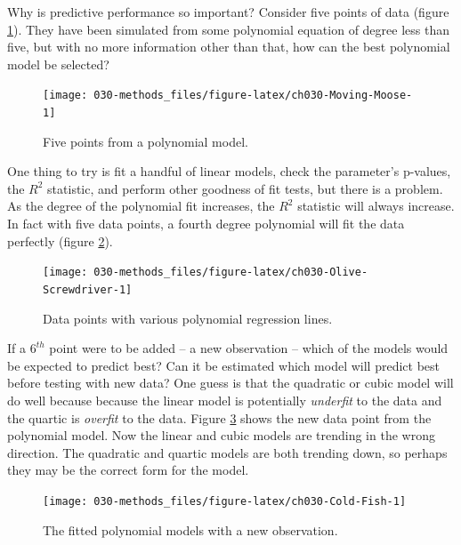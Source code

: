 \documentclass[11pt, oneside, openany]{scrbook}
\begin{document}
Why is predictive performance so important? Consider five points of data (figure \ref{fig:ch030-Moving-Moose}). They have been simulated from some polynomial equation of degree less than five, but with no more information other than that, how can the best polynomial model be selected?

\begin{figure}

{\centering \texttt{[image: 030-methods\_files/figure-latex/ch030-Moving-Moose-1]} 

}

\caption{Five points from a polynomial model.}\label{fig:ch030-Moving-Moose}
\end{figure}

One thing to try is fit a handful of linear models, check the parameter's p-values, the \(R^2\) statistic, and perform other goodness of fit tests, but there is a problem. As the degree of the polynomial fit increases, the \(R^2\) statistic will always increase. In fact with five data points, a fourth degree polynomial will fit the data perfectly (figure \ref{fig:ch030-Olive-Screwdriver}).

\begin{figure}

{\centering \texttt{[image: 030-methods\_files/figure-latex/ch030-Olive-Screwdriver-1]} 

}

\caption{Data points with various polynomial regression lines.}\label{fig:ch030-Olive-Screwdriver}
\end{figure}

If a \(6^{th}\) point were to be added -- a new observation -- which of the models would be expected to predict best? Can it be estimated which model will predict best before testing with new data? One guess is that the quadratic or cubic model will do well because because the linear model is potentially \emph{underfit} to the data and the quartic is \emph{overfit} to the data. Figure \ref{fig:ch030-Cold-Fish} shows the new data point from the polynomial model. Now the linear and cubic models are trending in the wrong direction. The quadratic and quartic models are both trending down, so perhaps they may be the correct form for the model.

\begin{figure}

{\centering \texttt{[image: 030-methods\_files/figure-latex/ch030-Cold-Fish-1]} 

}

\caption{The fitted polynomial models with a new observation.}\label{fig:ch030-Cold-Fish}
\end{figure}
\end{document}

